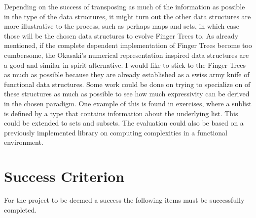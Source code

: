 \documentclass[12pt]{article}
\begin{document}
Depending on the success of transposing as much of the information as possible
in the type of the data structures, it might turn out the other data structures
are more illustrative to the process, such as perhaps maps and sets, in which
case those will be the chosen data structures to evolve Finger Trees to.
As already mentioned, if the complete dependent implementation of Finger Trees
become too cumbersome, the Okasaki's numerical representation inspired
data structures are a good and similar in spirit alternative. I would like to
stick to the Finger Trees as much as possible because they are already established
as a swiss army knife of functional data structures.
Some work could be done on trying to specialize on of these structures as much
as possible to see how much expressivity can be derived in the chosen paradigm.
One example of this is found in \cite{okasaki} exercises, where a sublist is defined by a
type that contains information about the underlying list. This could be extended
to sets and subsets.
The evaluation could also be based on a previously implemented library on computing
complexities in a functional environment. \cite{complexity}

\section*{Success Criterion}

For the project to be deemed a success the following items must be
successfully completed.
\end{document}
